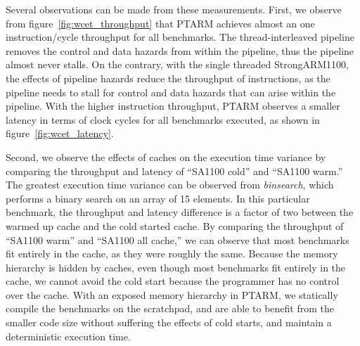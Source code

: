 Several observations can be made from these measurements. 
First, we observe from figure~\ref{fig:wcet_throughput} that PTARM achieves almost an one instruction/cycle throughput for all benchmarks.
The thread-interleaved pipeline removes the control and data hazards from within the pipeline, thus the pipeline almost never stalls.
On the contrary, with the single threaded StrongARM1100, the effects of pipeline hazards reduce the throughput of instructions, as the pipeline needs to stall for control and data hazards that can arise within the pipeline. 
With the higher instruction throughput, PTARM observes a smaller latency in terms of clock cycles for all benchmarks executed, as shown in figure~\ref{fig:wcet_latency}.
  
Second, we observe the effects of caches on the execution time variance by comparing the throughput and latency of ``SA1100 cold'' and ``SA1100 warm.'' 
The greatest execution time variance can be observed from \emph{binsearch}, which performs a binary search on an array of 15 elements. 
In this particular benchmark, the throughput and latency difference is a factor of two between the warmed up cache and the cold started cache.
By comparing the throughput of ``SA1100 warm'' and ``SA1100 all cache,'' we can observe that most benchmarks fit entirely in the cache, as they were roughly the same. 
Because the memory hierarchy is hidden by caches, even though most benchmarks fit entirely in the cache, we cannot avoid the cold start because the programmer has no control over the cache. 
With an exposed memory hierarchy in PTARM, we statically compile the benchmarks on the scratchpad, and are able to benefit from the smaller code size without suffering the effects of cold starts, and maintain a deterministic execution time. 


